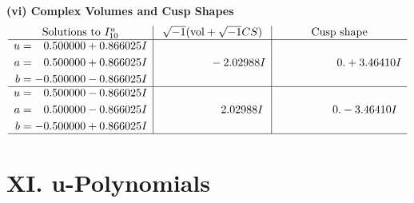 \documentclass[1p]{elsarticle_modified}
\theoremstyle{definition}
\newcommand{\I}{\sqrt{-1}}
\begin{document}
\newpage\flushleft \textbf{(vi) Complex Volumes and Cusp Shapes}
$$\begin{array}{c|c|c}  
\text{Solutions to }I^u_{10}& \I (\text{vol} + \sqrt{-1}CS) & \text{Cusp shape}\\
 \hline 
\begin{aligned}
u &= \phantom{-}0.500000 + 0.866025 I \\
a &= \phantom{-}0.500000 + 0.866025 I \\
b &= -0.500000 - 0.866025 I\end{aligned}
 & \phantom{-0.000000 } -2.02988 I & \phantom{-0.000000 -}0. + 3.46410 I \\ \hline\begin{aligned}
u &= \phantom{-}0.500000 - 0.866025 I \\
a &= \phantom{-}0.500000 - 0.866025 I \\
b &= -0.500000 + 0.866025 I\end{aligned}
 & \phantom{-0.000000 -}2.02988 I & \phantom{-0.000000 } 0. - 3.46410 I\\
 \hline 
 \end{array}$$\newpage
\newpage\renewcommand{\arraystretch}{1}
\centering \section*{ XI. u-Polynomials}
\end{document}
